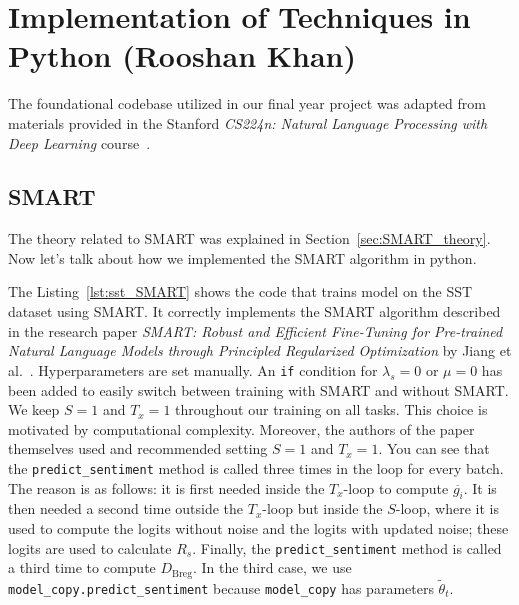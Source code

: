 
\chapter{Implementation of Techniques in Python (Rooshan Khan)}
\label{AppendixA}

The foundational codebase utilized in our final year project was adapted from materials provided in the Stanford \textit{CS224n: Natural Language Processing with Deep Learning} course~\cite{cs224n2024, amahankali2024}.


\section{SMART}
The theory related to SMART was explained in Section~\ref{sec:SMART_theory}. Now let's talk about how we implemented the SMART algorithm  in python.

The Listing~\ref{lst:sst_SMART} shows the code that trains model on the SST dataset using SMART. It correctly implements the SMART algorithm described in the research paper \textit{SMART: Robust and Efficient Fine-Tuning for Pre-trained Natural Language Models through Principled Regularized Optimization} by Jiang et al.~\cite{jiang2019smart}.
Hyperparameters are set manually.
An \texttt{if} condition for $\lambda_s = 0$ or $\mu = 0$ has been added to easily switch between training with SMART and without SMART. We keep $S = 1$ and $T_x = 1$ throughout our training on all tasks. This choice is motivated by computational complexity. Moreover, the authors of the paper themselves used and recommended setting $S = 1$ and $T_x = 1$.
You can see that the \texttt{predict\_sentiment} method is called three times in the loop for every batch. The reason is as follows: it is first needed inside the $T_x$-loop to compute $g_i^{\tilde{}}$. It is then needed a second time outside the $T_x$-loop but inside the $S$-loop, where it is used to compute the logits without noise and the logits with updated noise; these logits are used to calculate $R_s$. Finally, the \texttt{predict\_sentiment} method is called a third time to compute $D_{\text{Breg}}$. In the third case, we use \texttt{model\_copy.predict\_sentiment} because \texttt{model\_copy} has parameters $\tilde{\theta}_t$.

